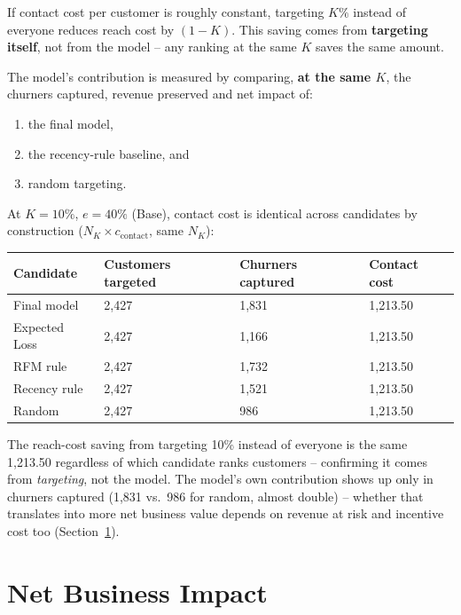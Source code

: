 If contact cost per customer is roughly constant, targeting $K\%$ instead of everyone reduces reach cost by $(1 - K)$. This saving comes from \textbf{targeting itself}, not from the model -- any ranking at the same $K$ saves the same amount.

The model's contribution is measured by comparing, \textbf{at the same $K$}, the churners captured, revenue preserved and net impact of:
\begin{enumerate}
    \item the final model,
    \item the recency-rule baseline, and
    \item random targeting.
\end{enumerate}

At $K=10\%$, $e=40\%$ (Base), contact cost is identical across candidates by construction ($N_K \times c_{\text{contact}}$, same $N_K$):

\begin{center}
\begin{tabular}{@{}p{2.8cm}p{3cm}p{3cm}p{2.6cm}@{}}
    \toprule
    Candidate & Customers targeted & Churners captured & Contact cost \\
    \midrule
    Final model & 2,427 & 1,831 & 1,213.50 \\
    Expected Loss & 2,427 & 1,166 & 1,213.50 \\
    RFM rule & 2,427 & 1,732 & 1,213.50 \\
    Recency rule & 2,427 & 1,521 & 1,213.50 \\
    Random & 2,427 & 986 & 1,213.50 \\
    \bottomrule
\end{tabular}
\end{center}

The reach-cost saving from targeting 10\% instead of everyone is the same 1,213.50 regardless of which candidate ranks customers -- confirming it comes from \emph{targeting}, not the model. The model's own contribution shows up only in churners captured (1,831 vs.\ 986 for random, almost double) -- whether that translates into more net business value depends on revenue at risk and incentive cost too (Section~\ref{sec:7-9}).

\section{Net Business Impact}
\label{sec:7-9}


